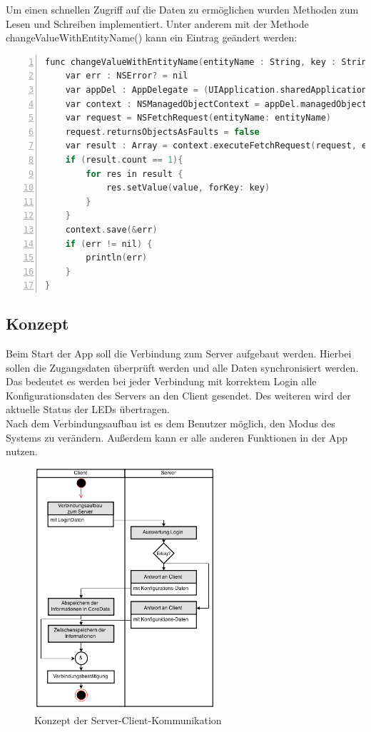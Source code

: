 Um einen schnellen Zugriff auf die Daten zu ermöglichen wurden Methoden zum Lesen und Schreiben implementiert. Unter anderem mit der Methode changeValueWithEntityName() kann ein Eintrag geändert werden: 
\begin{lstlisting}[caption =Implementierung HTTP-Request in Swift, language=C++, frame=single, breaklines=true,columns=fullflexible, commentstyle=\color{gray}\upshape, captionpos=b, numbers = left]
func changeValueWithEntityName(entityName : String, key : String, value : AnyObject) {
    var err : NSError? = nil
    var appDel : AppDelegate = (UIApplication.sharedApplication().delegate as! AppDelegate)
    var context : NSManagedObjectContext = appDel.managedObjectContext!
    var request = NSFetchRequest(entityName: entityName)
    request.returnsObjectsAsFaults = false
    var result : Array = context.executeFetchRequest(request, error: &err)! as Array
    if (result.count == 1){
	    for res in result {
		    res.setValue(value, forKey: key)
	    }
    }
    context.save(&err)
    if (err != nil) {
	    println(err)
    }
}
\end{lstlisting}

\subsection{Konzept}
Beim Start der App soll die Verbindung zum Server aufgebaut werden. Hierbei sollen die Zugangsdaten überprüft werden und alle Daten synchronisiert werden. Das bedeutet es werden bei jeder Verbindung mit korrektem Login alle Konfigurationsdaten des Servers an den Client gesendet. Des weiteren wird der aktuelle Status der LEDs übertragen. \\
Nach dem Verbindungsaufbau ist es dem Benutzer möglich, den Modus des Systems zu verändern. Außerdem kann er alle anderen Funktionen in der App nutzen.

\begin{figure}[h]
	\begin{minipage}{\textwidth}
		\centering
		\includegraphics[width=0.6\textwidth]{./data/konzept.png}
		\caption{Konzept der Server-Client-Kommunikation}
	\end{minipage}
\end{figure}

